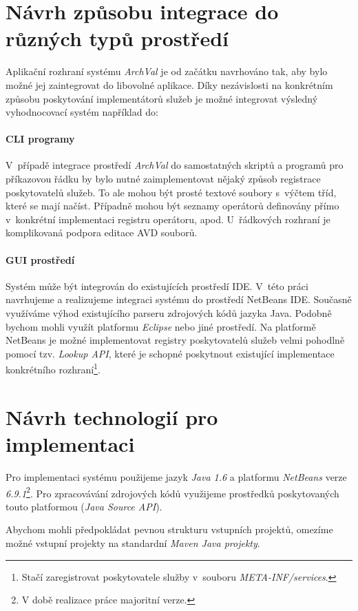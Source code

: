 \section{Návrh způsobu integrace do různých typů prostředí}
Aplikační rozhraní systému \emph{ArchVal} je od začátku navrhováno tak, aby bylo možné jej zaintegrovat do libovolné aplikace. Díky nezávislosti na konkrétním způsobu poskytování implementátorů služeb je možné integrovat výsledný vyhodnocovací systém například do:

\paragraph{CLI programy} V~případě integrace prostředí \emph{ArchVal} do samostatných skriptů a programů pro příkazovou řádku by bylo nutné zaimplementovat nějaký způsob registrace poskytovatelů služeb. To ale mohou být prosté textové soubory s~výčtem tříd, které se mají načíst. Případně mohou být seznamy operátorů definovány přímo v~konkrétní implementaci registru operátoru, apod. U~řádkových rozhraní je komplikovaná podpora editace AVD souborů.

\paragraph{GUI prostředí} Systém může být integrován do existujících prostředí IDE. V~této práci navrhujeme a realizujeme integraci systému do prostředí NetBeans IDE. Současně využíváme výhod existujícího parseru zdrojových kódů jazyka Java. Podobně bychom mohli využít platformu \emph{Eclipse} nebo jiné prostředí. Na platformě NetBeans je možné implementovat registry poskytovatelů služeb velmi pohodlně pomocí tzv. \emph{Lookup API}, které je schopné poskytnout existující implementace konkrétního rozhraní\footnote{Stačí zaregistrovat poskytovatele služby v~souboru \emph{META-INF/services}.}.

\section{Návrh technologií pro implementaci}
Pro implementaci systému použijeme jazyk \emph{Java 1.6} a platformu \emph{NetBeans} verze \emph{6.9.1}\footnote{V době realizace práce majoritní verze.}.  Pro zpracovávání zdrojových kódů využijeme prostředků poskytovaných touto platformou (\emph{Java Source API}).

Abychom mohli předpokládat pevnou strukturu vstupních projektů, omezíme možné vstupní projekty na standardní \emph{Maven Java projekty}.
